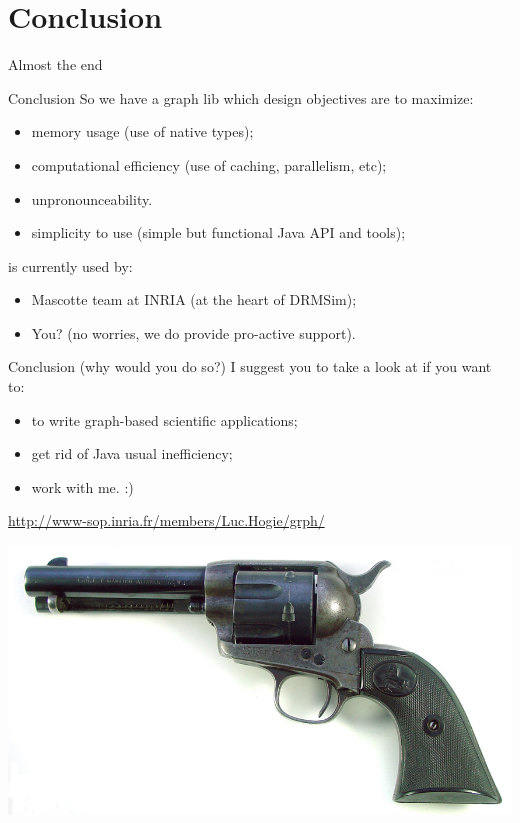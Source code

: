 \documentclass{beamer}
\newcommand{\sectionti}[1]{{\Huge #1}}
\begin{document}
\section{Conclusion}
\begin{frame}
\sectionti{Almost the end}
\end{frame}

\begin{frame}{Conclusion}
	So we have a \alert{graph lib} which design objectives are to maximize:
	  \begin{itemize}
  \item \alert{memory usage} (use of native types);
  \item \alert{computational efficiency} (use of caching, parallelism, etc);
  \item unpronounceability.
  \item \alert{simplicity to use} (simple but functional Java API and tools);
\end{itemize}
\grph is currently used by:
	  \begin{itemize}
  \item Mascotte team at INRIA (at the heart of DRMSim);
  \item You? (no worries, we do provide pro-active support).
\end{itemize}
\end{frame}

\begin{frame}{Conclusion (why would you do so?)}
	I suggest you to take a look at \grph if you want to:
	  \begin{itemize}
  \item to write graph-based scientific applications;
  \item get rid of Java usual inefficiency;
  \item work with me. :)
\end{itemize}
\vfill
\url{http://www-sop.inria.fr/members/Luc.Hogie/grph/}
\end{frame}


\begin{frame}
\begin{center}


\includegraphics[width=0.4\linewidth]{gun.jpg}
\end{center}
\end{frame}
\end{document}
